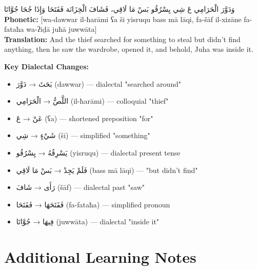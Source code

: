 \documentclass[letter,12pt]{article}
\begin{document}
\begin{tcolorbox}[colback=white,colframe=dialectcolor,title=\textbf{Levantine Version},breakable]
\textarabic{وَدَوَّرَ الْحَرَامِي عَ شِي يِسْرُقُو بَسْ مَا لَاقِي، فَشَافَ الْخِزَانَة فَفَتَحَا وَإِذَا جُحَا جُوَّاتَا}\\
\textbf{Phonetic:} [wa-dawwar il-ħarāmi ʕa ši yisruqu bass mā lāqi, fa-šāf il-xizāne fa-fataħa wa-ʔiḏā juħā juwwāta]\\
\textbf{Translation:} And the thief searched for something to steal but didn't find anything, then he saw the wardrobe, opened it, and behold, Juha was inside it.
\end{tcolorbox}

\textbf{Key Dialectal Changes:}
\begin{itemize}
\item \textarabic{بَحَثَ} → \textarabic{دَوَّرَ} (dawwar) — dialectal "searched around"
\item \textarabic{اللَّصُّ} → \textarabic{الْحَرَامِي} (il-ħarāmi) — colloquial "thief"
\item \textarabic{عَنْ} → \textarabic{عَ} (ʕa) — shortened preposition "for"
\item \textarabic{شَيْءٍ} → \textarabic{شِي} (ši) — simplified "something"
\item \textarabic{يَسْرِقُهُ} → \textarabic{يِسْرُقُو} (yisruqu) — dialectal present tense
\item \textarabic{فَلَمْ يَجِدْ} → \textarabic{بَسْ مَا لَاقِي} (bass mā lāqi) — "but didn't find"
\item \textarabic{رَأَى} → \textarabic{شَافَ} (šāf) — dialectal past "saw"
\item \textarabic{فَفَتَحَهَا} → \textarabic{فَفَتَحَا} (fa-fataħa) — simplified pronoun
\item \textarabic{فِيهَا} → \textarabic{جُوَّاتَا} (juwwāta) — dialectal "inside it"
\end{itemize}

\section{Additional Learning Notes}
\end{document}
